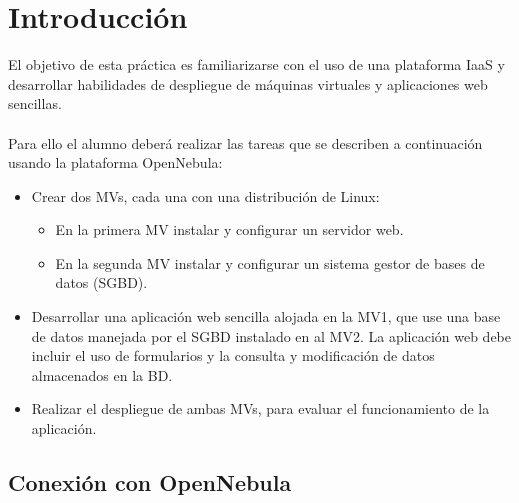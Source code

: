 \maketitle %
\thispagestyle{empty}

\newpage %

\tableofcontents %


\newpage


\section{Introducción}

El objetivo de esta práctica es familiarizarse con el uso de una plataforma IaaS y desarrollar habilidades de despliegue de máquinas virtuales y aplicaciones web sencillas.
\\ \\
Para ello el alumno deberá realizar las tareas que se describen a continuación usando la plataforma OpenNebula:

\begin{itemize}
	\item Crear dos MVs, cada una con una distribución de Linux:
	\begin{itemize}
		\item En la primera MV instalar y configurar un servidor web.
		\item En la segunda MV instalar y configurar un sistema gestor de bases de datos (SGBD).
	\end{itemize}
	\item Desarrollar una aplicación web sencilla alojada en la MV1, que use una base de datos manejada por el SGBD instalado en al MV2. La aplicación web debe incluir el uso de formularios y la consulta y modificación de datos almacenados en la BD.
	\item Realizar el despliegue de ambas MVs, para evaluar el funcionamiento de la aplicación.
\end{itemize}

\label{sec:conexion}
\subsection{Conexión con OpenNebula}

